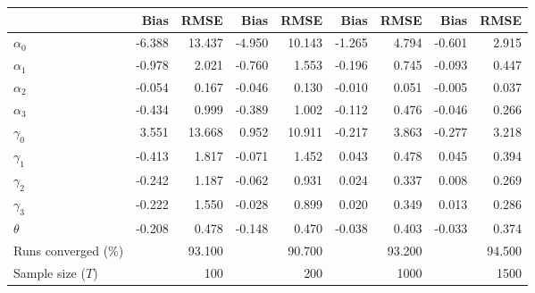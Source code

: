 
\begin{tabular}[t]{lrrrrrrrr}
\toprule
  & Bias & RMSE & Bias & RMSE & Bias & RMSE & Bias & RMSE\\
\midrule
$\alpha_{0}$ & -6.388 & 13.437 & -4.950 & 10.143 & -1.265 & 4.794 & -0.601 & 2.915\\
$\alpha_{1}$ & -0.978 & 2.021 & -0.760 & 1.553 & -0.196 & 0.745 & -0.093 & 0.447\\
$\alpha_{2}$ & -0.054 & 0.167 & -0.046 & 0.130 & -0.010 & 0.051 & -0.005 & 0.037\\
$\alpha_{3}$ & -0.434 & 0.999 & -0.389 & 1.002 & -0.112 & 0.476 & -0.046 & 0.266\\
$\gamma_{0}$ & 3.551 & 13.668 & 0.952 & 10.911 & -0.217 & 3.863 & -0.277 & 3.218\\
$\gamma_{1}$ & -0.413 & 1.817 & -0.071 & 1.452 & 0.043 & 0.478 & 0.045 & 0.394\\
$\gamma_{2}$ & -0.242 & 1.187 & -0.062 & 0.931 & 0.024 & 0.337 & 0.008 & 0.269\\
$\gamma_{3}$ & -0.222 & 1.550 & -0.028 & 0.899 & 0.020 & 0.349 & 0.013 & 0.286\\
$\theta$ & -0.208 & 0.478 & -0.148 & 0.470 & -0.038 & 0.403 & -0.033 & 0.374\\
Runs converged (\%) &  & 93.100 &  & 90.700 &  & 93.200 &  & 94.500\\
Sample size ($T$) &  & 100 &  & 200 &  & 1000 &  & 1500\\
\bottomrule
\end{tabular}

